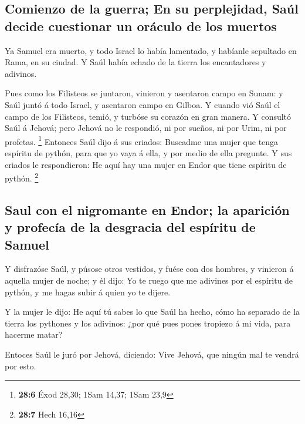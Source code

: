 \hypertarget{comienzo-de-la-guerra-en-su-perplejidad-sauxfal-decide-cuestionar-un-oruxe1culo-de-los-muertos}{%
\subsection{Comienzo de la guerra; En su perplejidad, Saúl decide
cuestionar un oráculo de los
muertos}\label{comienzo-de-la-guerra-en-su-perplejidad-sauxfal-decide-cuestionar-un-oruxe1culo-de-los-muertos}}

 Ya Samuel era muerto, y todo Israel lo había lamentado, y
habíanle sepultado en Rama, en su ciudad. Y Saúl había echado de la
tierra los encantadores y adivinos.

 Pues como los Filisteos se juntaron, vinieron y asentaron
campo en Sunam: y Saúl juntó á todo Israel, y asentaron campo en Gilboa.
 Y cuando vió Saúl el campo de los Filisteos, temió, y
turbóse su corazón en gran manera.  Y consultó Saúl á
Jehová; pero Jehová no le respondió, ni por sueños, ni por Urim, ni por
profetas. \footnote{\textbf{28:6} Éxod 28,30; 1Sam 14,37; 1Sam 23,9}
 Entonces Saúl dijo á sus criados: Buscadme una mujer que
tenga espíritu de pythón, para que yo vaya á ella, y por medio de ella
pregunte. Y sus criados le respondieron: He aquí hay una mujer en Endor
que tiene espíritu de pythón. \footnote{\textbf{28:7} Hech 16,16}

\hypertarget{saul-con-el-nigromante-en-endor-la-apariciuxf3n-y-profecuxeda-de-la-desgracia-del-espuxedritu-de-samuel}{%
\subsection{Saul con el nigromante en Endor; la aparición y profecía de
la desgracia del espíritu de
Samuel}\label{saul-con-el-nigromante-en-endor-la-apariciuxf3n-y-profecuxeda-de-la-desgracia-del-espuxedritu-de-samuel}}

 Y disfrazóse Saúl, y púsose otros vestidos, y fuése con
dos hombres, y vinieron á aquella mujer de noche; y él dijo: Yo te ruego
que me adivines por el espíritu de pythón, y me hagas subir á quien yo
te dijere.

 Y la mujer le dijo: He aquí tú sabes lo que Saúl ha
hecho, cómo ha separado de la tierra los pythones y los adivinos: ¿por
qué pues pones tropiezo á mi vida, para hacerme matar?

 Entoces Saúl le juró por Jehová, diciendo: Vive Jehová,
que ningún mal te vendrá por esto.

